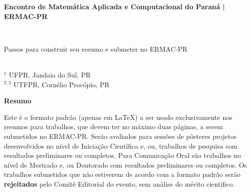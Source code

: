 \documentclass[a4paper, 11pt]{article}
\begin{document}

	\begin{center}
	\textbf{Encontro de Matemática Aplicada e Computacional do Paraná | ERMAC-PR}
	\end{center}
	\vspace{-1.1em}
	\hrulefill\\
	\begin{center}
		\large{Passos para construir seu resumo e submeter no ERMAC-PR}
	\end{center}

	\\
	{\footnotesize
	$^{1}$ UFPR, Jandaia do Sul, PR\\ 
	$^{2,3}$ UTFPR, Cornélio Procópio, PR
	}

\begin{center}
\textbf{Resumo}
\end{center}

\indent Este é o formato padrão (apenas em \LaTeX) a ser usado exclusivamente nos resumos para trabalhos, que devem ter no máximo duas páginas, a serem submetidos no ERMAC-PR. Serão avaliados para sessões de pôsteres projetos desenvolvidos no nível de Iniciação Científica e, ou, trabalhos de pesquisa com resultados preliminares ou completos. Para Comunicação Oral são trabalhos no nível de Mestrado e, ou Doutorado com resultados preliminares ou completos. Os trabalhos submetidos que não estiverem de acordo com a formato padrão serão {\bf rejeitados} pelo Comitê Editorial do evento, sem análise do mérito científico.
\end{document}
